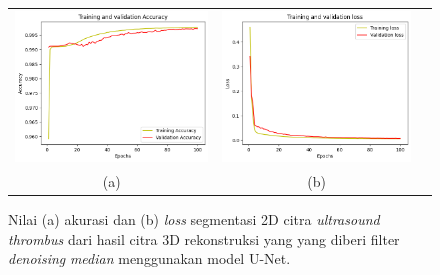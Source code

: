 \begin{enumerate}
	
	\begin{figure}[htbp]
		\centering
		\begin{tabular}{ccc}
			\includegraphics[scale=0.5]{bab4/Rekap Training/UNet/Median/5/acc_99,71805214881897.png} &
			\includegraphics[scale=0.5]{bab4/Rekap Training/UNet/Median/5/loss_0,0070.png} & \\
			(a) & (b)    %
		\end{tabular}
		\caption{Nilai (a) akurasi dan (b) \textit{loss} segmentasi 2D citra \textit{ultrasound} \textit{thrombus} dari hasil citra 3D rekonstruksi yang yang diberi filter \textit{denoising} \textit{median} menggunakan model U-Net.}
		\label{fig:performance-median-unet-rekonstruksi}
	\end{figure}
	

\end{enumerate}

